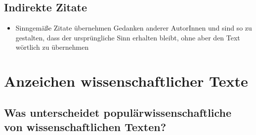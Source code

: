 \documentclass{article}
\begin{document}
	\subsection{Indirekte Zitate}
	\begin{itemize}
		\item{Sinngemäße Zitate übernehmen Gedanken anderer AutorInnen und sind so zu gestalten, dass der ursprüngliche Sinn erhalten bleibt, ohne aber den Text wörtlich zu übernehmen}
	\end{itemize}

	\section{Anzeichen wissenschaftlicher Texte}
	\subsection{Was unterscheidet populärwissenschaftliche von wissenschaftlichen Texten?}
	

	
\end{document}
